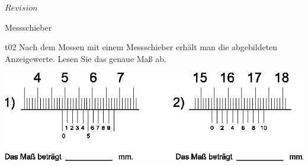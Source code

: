 \RCS $Revision$
\begin{aufgabe}[Technologie]{Messschieber}
   \begin{teilaufgabe}[ohnenummer]{t}{0}{2}
       Nach dem Messen mit einem Messschieber erhält man die abgebildeten
       Anzeigewerte. Lesen Sie das genaue Maß ab. \par
       \vspace{5mm} \par
       \includegraphics[width=155mm]{aufgabe-8} \par
       \korrektur{-6mm} 
   \end{teilaufgabe}
   \begin{loesung}
   \end{loesung}
  \end{aufgabe}

